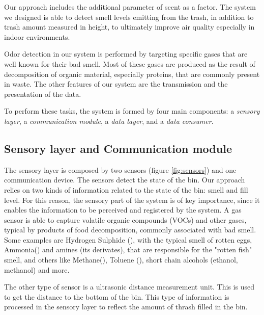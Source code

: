 Our approach includes the additional parameter of scent as a factor.
The system we designed is able to detect smell levels emitting from the trash, in addition to trash amount measured in height, to ultimately improve air quality especially in indoor environments.

Odor detection in our system is performed by targeting specific gases that are well known for their bad smell.
Most of these gases are produced as the result of decomposition of organic material, especially proteins, that are commonly present in waste.
The other features of our system are the transmission and the presentation of the data.


To perform these tasks, the system is formed by four main components: a \textit{sensory layer}, a \textit{communication module},  a \textit{	data layer}, and a \textit{data consumer}. 

\subsection{Sensory layer and Communication module}
The sensory layer is composed by two sensors (figure \ref{fig:sensors}) and one communication device. The sensors detect the state of the bin.
Our approach relies on two kinds of information related to the state of the bin: smell and fill level.
For this reason, the sensory part of the system is of key importance, since it enables the information to be perceived and registered by the system.
A gas sensor is able to capture volatile organic compounds (VOCs) and other gases, typical by products of food decomposition, commonly associated with bad smell. 
Some examples are Hydrogen Sulphide (), with the typical smell of rotten eggs, Ammonia() and amines (its derivates), that are responsible for the "rotten fish" smell, and others like Methane(), Toluene (), short chain alcohols (ethanol, methanol) and more.

The other type of sensor is a ultrasonic distance measurement unit. This is used to get the distance to the bottom of the bin.
This type of information is processed in the sensory layer to reflect the amount of thrash filled in the bin.

